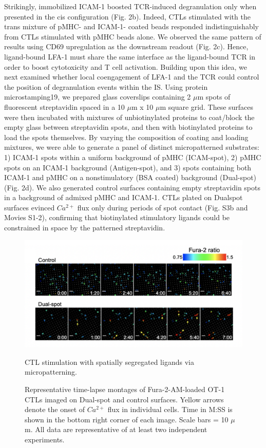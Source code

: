 Strikingly, immobilized ICAM-1 boosted TCR-induced degranulation only when presented in the cis configuration (Fig. 2b). Indeed, CTLs stimulated with the trans mixture of pMHC- and ICAM-1- coated beads responded indistinguishably from CTLs stimulated with pMHC beads alone. We observed the same pattern of results using CD69 upregulation as the downstream readout (Fig. 2c). Hence, ligand-bound LFA-1 must share the same interface as the ligand-bound TCR in order to boost cytotoxicity and T cell activation. Building upon this idea, we next examined whether local coengagement of LFA-1 and the TCR could control the position of degranulation events within the IS. Using protein microstamping19, we prepared glass coverslips containing 2 $\mu$m spots of fluorescent streptavidin spaced in a 10 $\mu$m x 10 $\mu$m square grid. These surfaces were then incubated with mixtures of unbiotinylated proteins to coat/block the empty glass between streptavidin spots, and then with biotinylated proteins to load the spots themselves. By varying the composition of coating and loading mixtures, we were able to generate a panel of distinct micropatterned substrates: 1) ICAM-1 spots within a uniform background of pMHC (ICAM-spot), 2) pMHC spots on an ICAM-1 background (Antigen-spot), and 3) spots containing both ICAM-1 and pMHC on a nonstimulatory (BSA coated) background (Dual-spot) (Fig. 2d). We also generated control surfaces containing empty streptavidin spots in a background of admixed pMHC and ICAM-1. CTLs plated on Dualspot surfaces evinced $Ca^{2+}$ flux only during periods of spot contact (Fig. S3b and Movies S1-2), confirming that biotinylated stimulatory ligands could be constrained in space by the patterned streptavidin. 

\begin{figure}[htbp]
	\centering
	\includegraphics[width=1.0\columnwidth]{../figures/chapter3/fig2stampingcaflux.png}
	\caption{CTL stimulation with spatially segregated ligands via micropatterning.}
	\caption*{Representative time-lapse montages of Fura-2-AM-loaded
OT-1 CTLs imaged on Dual-spot and control surfaces. Yellow arrows denote the onset of $Ca^{2+}$ flux in individual cells. Time in M:SS is shown in the bottom right corner of each image. Scale bars = 10 $\mu$m. All data are representative of at least two independent experiments.}
	\label{fig:fig2stampingcaflux}
\end{figure} 

